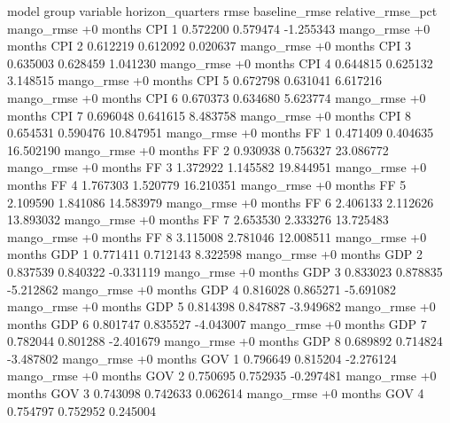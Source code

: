      model     group variable  horizon_quarters     rmse  baseline_rmse  relative_rmse_pct
mango_rmse +0 months      CPI                 1 0.572200       0.579474          -1.255343
mango_rmse +0 months      CPI                 2 0.612219       0.612092           0.020637
mango_rmse +0 months      CPI                 3 0.635003       0.628459           1.041230
mango_rmse +0 months      CPI                 4 0.644815       0.625132           3.148515
mango_rmse +0 months      CPI                 5 0.672798       0.631041           6.617216
mango_rmse +0 months      CPI                 6 0.670373       0.634680           5.623774
mango_rmse +0 months      CPI                 7 0.696048       0.641615           8.483758
mango_rmse +0 months      CPI                 8 0.654531       0.590476          10.847951
mango_rmse +0 months       FF                 1 0.471409       0.404635          16.502190
mango_rmse +0 months       FF                 2 0.930938       0.756327          23.086772
mango_rmse +0 months       FF                 3 1.372922       1.145582          19.844951
mango_rmse +0 months       FF                 4 1.767303       1.520779          16.210351
mango_rmse +0 months       FF                 5 2.109590       1.841086          14.583979
mango_rmse +0 months       FF                 6 2.406133       2.112626          13.893032
mango_rmse +0 months       FF                 7 2.653530       2.333276          13.725483
mango_rmse +0 months       FF                 8 3.115008       2.781046          12.008511
mango_rmse +0 months      GDP                 1 0.771411       0.712143           8.322598
mango_rmse +0 months      GDP                 2 0.837539       0.840322          -0.331119
mango_rmse +0 months      GDP                 3 0.833023       0.878835          -5.212862
mango_rmse +0 months      GDP                 4 0.816028       0.865271          -5.691082
mango_rmse +0 months      GDP                 5 0.814398       0.847887          -3.949682
mango_rmse +0 months      GDP                 6 0.801747       0.835527          -4.043007
mango_rmse +0 months      GDP                 7 0.782044       0.801288          -2.401679
mango_rmse +0 months      GDP                 8 0.689892       0.714824          -3.487802
mango_rmse +0 months      GOV                 1 0.796649       0.815204          -2.276124
mango_rmse +0 months      GOV                 2 0.750695       0.752935          -0.297481
mango_rmse +0 months      GOV                 3 0.743098       0.742633           0.062614
mango_rmse +0 months      GOV                 4 0.754797       0.752952           0.245004
